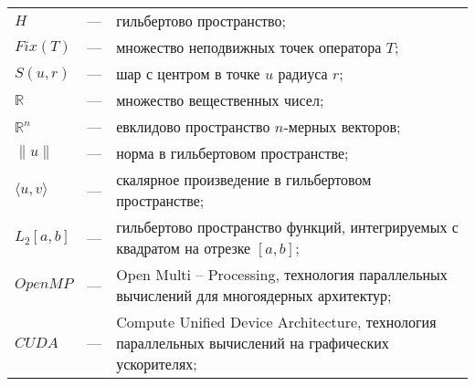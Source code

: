 
\begin{longtable}{lp{}p{}}
	
$H$ & --- & гильбертово пространство;\\

$Fix(T)$ & --- & множество неподвижных точек оператора $T$;\\

$S(u, r)$ & --- & шар с центром в точке $u$ радиуса $r$;\\

$\mathbb{R}$ & --- & множество вещественных чисел;\\

$\mathbb{R}^n$ & --- & евклидово пространство $n$-мерных векторов; \\

$\|u\|$ & --- & норма в гильбертовом пространстве;\\

$\langle u, v\rangle$ & --- & скалярное произведение в гильбертовом пространстве;\\

$L_2[a, b]$ & --- & гильбертово пространство функций, интегрируемых с квадратом на отрезке $[a, b]$;\\

$OpenMP$ & --- & Open Multi -- Processing, технология параллельных вычислений для многоядерных архитектур;\\

$CUDA$ & --- & Compute Unified Device Architecture, технология параллельных вычислений на графических ускорителях;\\

\end{longtable}
